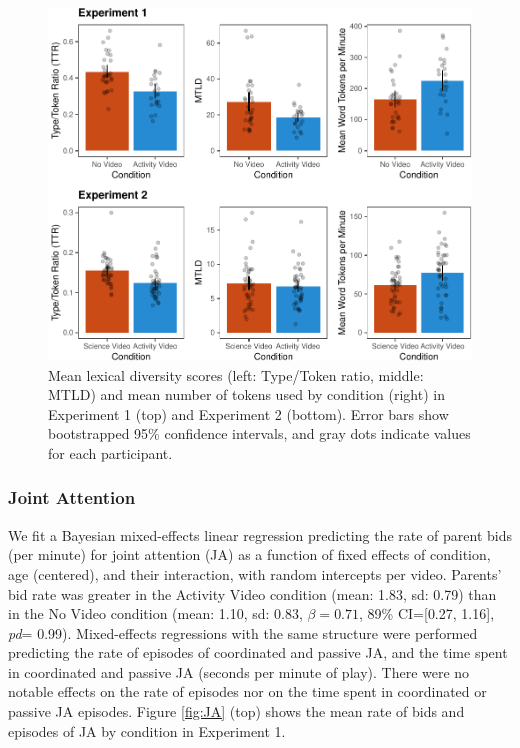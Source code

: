 \documentclass[man,floatsintext]{apa6}
\begin{document}
\begin{figure}[H]

{\centering \includegraphics{figs/fig-lexdiv-1} 

}

\caption{\label{fig:lexdiv} Mean lexical diversity scores (left: Type/Token ratio, middle: MTLD) and mean number of tokens used by condition (right) in Experiment 1 (top) and Experiment 2 (bottom). Error bars show bootstrapped 95\% confidence intervals, and gray dots indicate values for each participant.}\label{fig:fig-lexdiv}
\end{figure}

\hypertarget{joint-attention}{%
\subsubsection{Joint Attention}\label{joint-attention}}

We fit a Bayesian mixed-effects linear regression predicting the rate of parent bids (per minute) for joint attention (JA) as a function of fixed effects of condition, age (centered), and their interaction, with random intercepts per video.
Parents' bid rate was greater in the Activity Video condition (mean: 1.83, sd: 0.79) than in the No Video condition (mean: 1.10, sd: 0.83, \(\beta=0.71\), 89\% CI={[}0.27, 1.16{]}, \emph{pd}= 0.99).
Mixed-effects regressions with the same structure were performed predicting the rate of episodes of coordinated and passive JA, and the time spent in coordinated and passive JA (seconds per minute of play).
There were no notable effects on the rate of episodes nor on the time spent in coordinated or passive JA episodes.
Figure \ref{fig:JA} (top) shows the mean rate of bids and episodes of JA by condition in Experiment 1.
\end{document}
